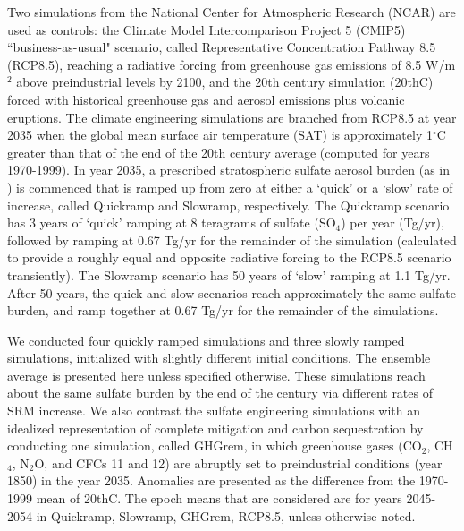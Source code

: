\documentclass[grl]{AGUTeX}  %
\begin{document}
\begin{article}
Two simulations from the National Center for Atmospheric Research (NCAR) are used as controls: the Climate Model Intercomparison Project 5 (CMIP5) ``business-as-usual" scenario, called Representative Concentration Pathway 8.5 (RCP8.5), reaching a radiative forcing from greenhouse gas emissions of 8.5 W/m$^{2}$ above preindustrial levels by 2100, and the 20th century simulation (20thC) forced with historical greenhouse gas and aerosol emissions plus volcanic eruptions. The climate engineering simulations are branched from RCP8.5 at year 2035 when the global mean surface air temperature (SAT) is approximately 1$^\circ$C greater than that of the end of the 20th century average (computed for years 1970-1999). In year 2035, a prescribed stratospheric sulfate aerosol burden (as in \citet{mccusker12}) is commenced that is ramped up from zero at either a `quick' or a `slow' rate of increase, called Quickramp and Slowramp, respectively. The Quickramp scenario has 3 years of `quick' ramping at 8 teragrams of sulfate (SO$_4$) per year (Tg/yr), followed by ramping at 0.67 Tg/yr for the remainder of the simulation (calculated to provide a roughly equal and opposite radiative forcing to the RCP8.5 scenario transiently). The Slowramp scenario has 50 years of `slow' ramping at 1.1 Tg/yr. After 50 years, the quick and slow scenarios reach approximately the same sulfate burden, and ramp together at 0.67 Tg/yr for the remainder of the simulations. %

We conducted four quickly ramped simulations and three slowly ramped simulations, initialized with slightly different initial conditions. The ensemble average is presented here unless specified otherwise. These simulations reach about the same sulfate burden by the end of the century via different rates of SRM increase. We also contrast the sulfate engineering simulations with an idealized representation of complete mitigation and carbon sequestration by conducting one simulation, called GHGrem, in which greenhouse gases (CO$_2$, CH$_4$, N$_2$O, and CFCs 11 and 12) are abruptly set to preindustrial conditions (year 1850) in the year 2035. Anomalies are presented as the difference from the 1970-1999 mean of 20thC. The epoch means that are considered are for years 2045-2054 in Quickramp, Slowramp, GHGrem, RCP8.5, unless otherwise noted.%


\end{article}
\end{document}
